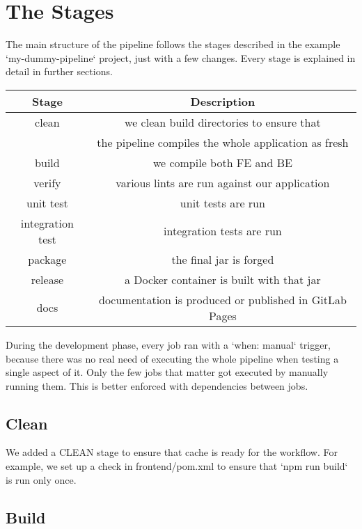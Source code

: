 \documentclass[a4paper,10pt]{scrartcl}
\begin{document}
\section{The Stages}

The main structure of the pipeline follows the stages described in the example `my-dummy-pipeline` project, just with a few changes. Every stage is explained in detail in further sections.

\begin{center}
    \begin{tabular}{|c|c|}
        \hline
        Stage & Description \\
        \hline
        clean & we clean build directories to ensure that \\
        & the pipeline compiles the whole application as fresh \\
        \hline
        build & we compile both FE and BE \\
        \hline
        verify & various lints are run against our application \\
        \hline
        unit test & unit tests are run \\
        \hline
        integration test & integration tests are run \\
        \hline
        package & the final jar is forged \\
        \hline
        release & a Docker container is built with that jar \\
        \hline
        docs & documentation is produced or published in GitLab Pages \\
        \hline
    \end{tabular}
\end{center}

During the development phase, every job ran with a `when: manual` trigger, because there was no real need of executing the whole pipeline when testing a single aspect of it. Only the few jobs that matter got executed by manually running them. This is better enforced with dependencies between jobs.

\subsection{Clean}

We added a CLEAN stage to ensure that cache is ready for the workflow. For example, we set up a check in frontend/pom.xml to ensure that `npm run build` is run only once.

\subsection{Build}
\end{document}

